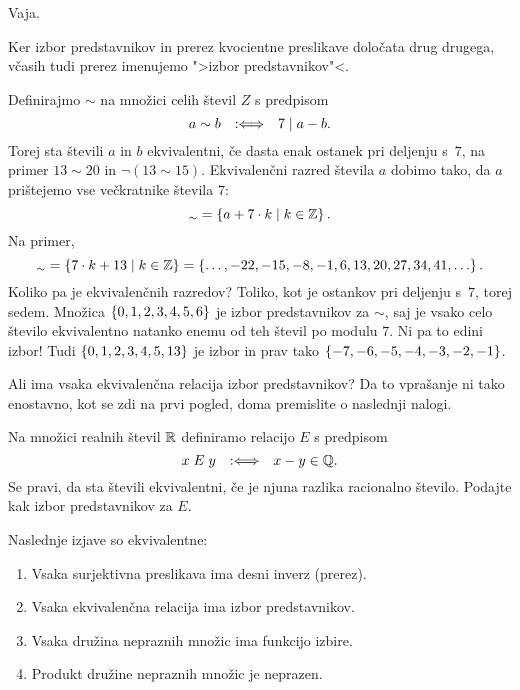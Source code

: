 \begin{dokaz}
  Vaja.
\end{dokaz}

Ker izbor predstavnikov in prerez kvocientne preslikave določata drug drugega, včasih tudi
prerez imenujemo ">izbor predstavnikov"<.

\begin{zgled}
  Definirajmo $\sim$ na množici celih števil $Z$ s predpisom
  \begin{equation*}
    a \sim b \quad {{:}{\Longleftrightarrow}}\quad 7 \mathrel{|} a - b.
  \end{equation*}
  Torej sta števili $a$ in $b$ ekvivalentni, če dasta enak ostanek pri deljenju s~$7$,
  na primer $13 \sim 20$ in $\lnot (13 \sim 15)$.
  Ekvivalenčni razred števila $a$ dobimo tako, da $a$ prištejemo vse večkratnike števila $7$:
  \begin{equation*}
    [a]_{\sim} = \set{ a + 7 \cdot k \such k \in \ZZ }.
  \end{equation*}
  Na primer,
  \begin{equation*}
    [13]_\sim = \set{ 7 \cdot k + 13 \such k \in \ZZ }
           = \set{ \ldots, -22, -15, -8, -1, 6, 13, 20, 27, 34, 41, \ldots}.
  \end{equation*}
  Koliko pa je ekvivalenčnih razredov? Toliko, kot je ostankov pri deljenju s~$7$, torej sedem. Množica
  $\left\{0, 1, 2, 3, 4, 5, 6\right\}$ je izbor predstavnikov za $\sim$, saj je vsako celo število ekvivalentno natanko enemu od
  teh števil po modulu $7$.
  Ni pa to edini izbor! Tudi $\left\{0, 1, 2, 3, 4, 5, 13\right\}$ je izbor in prav tako $\left\{-7, -6, -5, -4, -3, -2, -1\right\}$.
\end{zgled}

Ali ima vsaka ekvivalenčna relacija izbor predstavnikov? Da to vprašanje ni tako
enostavno, kot se zdi na prvi pogled, doma premislite o naslednji nalogi.

\begin{vaja}
  Na množici realnih števil $\mathbb{R}$ definiramo relacijo $E$ s predpisom
  \begin{equation*}
    x \mathrel{E} y  \quad {{:}{\Longleftrightarrow}}\quad  x - y \in \mathbb{Q}.
  \end{equation*}
  Se pravi, da sta števili ekvivalentni, če je njuna razlika racionalno število. Podajte kak
  izbor predstavnikov za $E$.
\end{vaja}

\begin{izrek}
  Naslednje izjave so ekvivalentne:
  \begin{enumerate}
  \item Vsaka surjektivna preslikava ima desni inverz (prerez).
  \item Vsaka ekvivalenčna relacija ima izbor predstavnikov.
  \item Vsaka družina nepraznih množic ima funkcijo izbire.
  \item Produkt družine nepraznih množic je neprazen.
  \end{enumerate}
\end{izrek}

